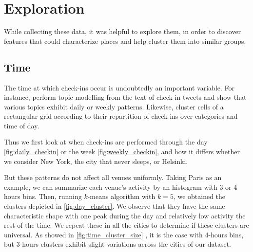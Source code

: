 \section{Exploration}
\label{sec:exploration}

While collecting these data, it was helpful to explore them, in order to
discover features that could characterize places and help cluster them into
similar groups.

\subsection{Time}

The time at which check-ins occur is undoubtedly an important variable. For
instance, \textcite{UrbanStory12} perform topic modelling from the text of
check-in tweets and show that various topics exhibit daily or weekly
patterns. Likewise, \textcite{TimeCluster13} cluster cells of a rectangular
grid according to their repartition of check-ins over categories and time of
day.

Thus we first look at when check-ins are performed through the day
\autoref{fig:daily_checkin} or the week \autoref{fig:weekly_checkin}, and how it
differs whether we consider New York, the city that never sleeps, or Helsinki.

But these patterns do not affect all venues uniformly. Taking Paris as an
example, we can summarize each venue's activity by an histogram with 3 or 4
hours bins. Then, running $k$-means algorithm with $k=5$, we obtained the
clusters depicted in \autoref{fig:day_cluster}. We observe that they have the
same characteristic shape with one peak during the day and relatively low
activity the rest of the time. We repeat these in all the cities to determine
if these clusters are universal. As showed in \autoref{fig:time_cluster_size}
, it is the case with 4-hours bins, but
3-hours clusters exhibit slight variations across the cities of our dataset.

